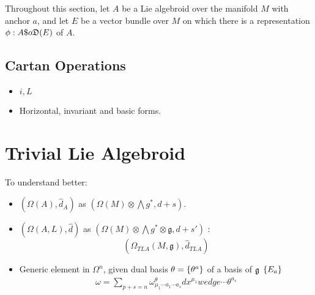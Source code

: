 \linea 

Throughout this section, let $A$ be a Lie algebroid over the manifold $M$ with anchor $a$, and let $E$ be a vector bundle over $M$ on which there is a representation $\phi: A \$o \alg D(E)$ of $A$.

\begin{definition}

\end{definition}
\subsection{Cartan Operations}

\begin{itemize}

\item $i, L$

\item Horizontal, invariant and basic forms.

\end{itemize}

\section{Trivial Lie Algebroid}

To understand better:
\begin{itemize}
    
\item $(\Omega(A), \hat d_A)$ as $(\Omega(M)\otimes \bigwedge g^*, d + s)$.

\item $(\Omega(A, L), \hat d)$ as $(\Omega(M)\otimes \bigwedge g^* \otimes \mathfrak g, d + s')$ : \[(\Omega_{TLA}(M, \mathfrak g), \hat d_{TLA})\]

\item Generic element in $\Omega^n$, given dual basis $\theta = \left\{ \theta^a \right\}$ of a basis of $\mathfrak{g}$ $\left\{ E_a \right\}$
\begin{align*}
    \omega = \sum_{p + s = n} \omega^\theta_{\mu_1 \cdots a_1 \cdots a_s} dx^{\mu_1} wedge \cdots \theta^{a_s}
\end{align*}
    
\end{itemize}

